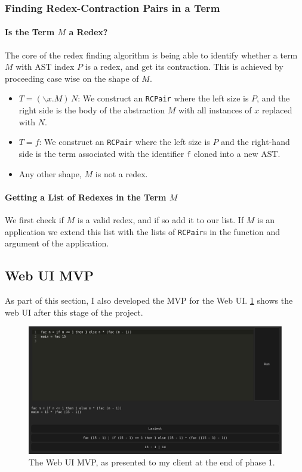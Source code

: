 \subsubsection{Finding Redex-Contraction Pairs in a Term}
\paragraph{Is the Term $M$ a Redex?}
The core of the redex finding algorithm is being able to identify whether a term $M$ with \ac{AST} index $P$ is a redex, and get its contraction. This is achieved by proceeding case wise on the shape of $M$.
\begin{itemize}
    \item $T = (\backslash x. M)\, N$: We construct an \verb|RCPair| where the left size is $P$, and the right side is the body of the abstraction $M$ with all instances of $x$ replaced with $N$. 
    \item $T = f$: We construct an \verb|RCPair| where the left size is $P$ and the right-hand side is the term associated with the identifier \verb|f| cloned into a new \ac{AST}. 
    \item Any other shape, $M$ is not a redex. 
\end{itemize}

\paragraph{Getting a List of Redexes in the Term $M$}
We first check if $M$ is a valid redex, and if so add it to our list. If $M$ is an application we extend this list with the lists of \verb|RCPair|s in the function and argument of the application. 

\subsection{Web UI \ac{MVP}}
As part of this section, I also developed the MVP for the Web UI. \ref{fig:screenshot_phase_1_end} shows the web UI after this stage of the project. 

\begin{figure}[h]
    \centering
    \includegraphics[width=1\linewidth]{images/phase-1-end.png} 
    \captionsetup{justification=centering}
    \caption{The Web UI \ac{MVP}, as presented to my client at the end of phase 1.}
    \label{fig:screenshot_phase_1_end}
\end{figure}

